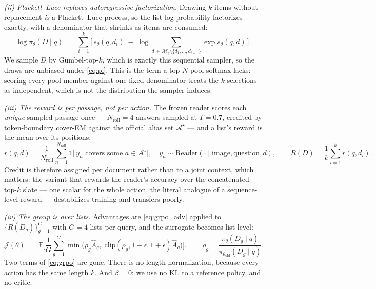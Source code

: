 \emph{(ii) Plackett--Luce replaces autoregressive factorization.} Drawing $k$ items without
replacement \emph{is} a Plackett--Luce process, so the list log-probability factorizes exactly,
with a denominator that shrinks as items are consumed:
\begin{equation}
\log \pi_\theta(D \mid q) \;=\; \sum_{i=1}^{k}\Big[\, s_\theta(q,d_i)
\;-\; \log \!\!\!\sum_{d \,\in\, \mathcal{M}_q \setminus \{d_1,\dots,d_{i-1}\}} \!\!\! \exp s_\theta(q,d) \,\Big].
\label{eq:pl}
\end{equation}
We sample $D$ by Gumbel-top-$k$, which is exactly this sequential sampler, so the draws are
unbiased under \eqref{eq:pl}. This is the term a top-$N$ pool softmax lacks: scoring every pool
member against one fixed denominator treats the $k$ selections as independent, which is not the
distribution the sampler induces.

\emph{(iii) The reward is per passage, not per action.} The frozen reader scores each
\emph{unique} sampled passage once --- $N_{\mathrm{roll}}{=}4$ answers sampled at $T{=}0.7$,
credited by token-boundary cover-EM against the official alias set $\mathcal{A}^\star$ --- and a
list's reward is the mean over its positions:
\begin{equation}
r(q,d) = \frac{1}{N_{\mathrm{roll}}}\sum_{n=1}^{N_{\mathrm{roll}}}
\mathbb{1}\big[\,y_n \text{ covers some } a \in \mathcal{A}^\star \big],
\quad y_n \sim \text{Reader}(\cdot \mid \text{image}, \text{question}, d),
\qquad
R(D) = \frac{1}{k}\sum_{i=1}^{k} r(q,d_i).
\label{eq:reward}
\end{equation}
Credit is therefore assigned per document rather than to a joint context, which matters: the
variant that rewards the reader's accuracy over the concatenated top-$k$ slate --- one scalar for
the whole action, the literal analogue of a sequence-level reward --- destabilizes training and
transfers poorly.

\emph{(iv) The group is over lists.} Advantages are \eqref{eq:grpo_adv} applied to
$\{R(D_g)\}_{g=1}^{G}$ with $G{=}4$ lists per query, and the surrogate becomes list-level:
\begin{equation}
\mathcal{J}(\theta) \;=\; \mathbb{E}\Big[\frac{1}{G}\sum_{g=1}^{G}
\min\big(\rho_g \hat{A}_g,\; \mathrm{clip}(\rho_g,1-\epsilon,1+\epsilon)\hat{A}_g\big)\Big],
\qquad
\rho_g = \frac{\pi_\theta(D_g \mid q)}{\pi_{\theta_{\mathrm{old}}}(D_g \mid q)} .
\label{eq:ours}
\end{equation}
Two terms of \eqref{eq:grpo} are gone. There is no length normalization, because every action has
the same length $k$. And $\beta{=}0$: we use no KL to a reference policy, and no critic.

